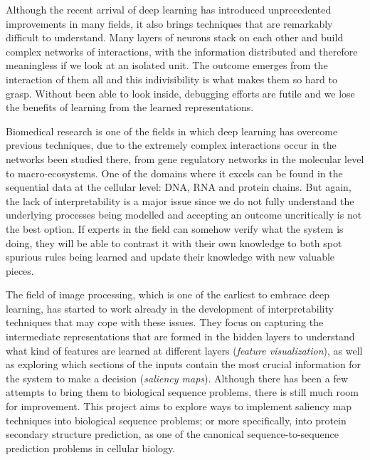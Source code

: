 Although the recent arrival of deep learning has introduced unprecedented improvements in many fields, it also brings techniques that are remarkably difficult to understand. Many layers of neurons stack on each other and build complex networks of interactions, with the information distributed and therefore meaningless if we look at an isolated unit. The outcome emerges from the interaction of them all and this indivisibility is what makes them so hard to grasp. Without been able to look inside, debugging efforts are futile and we lose the benefits of learning from the learned representations.

Biomedical research is one of the fields in which deep learning has overcome previous techniques, due to the extremely complex interactions occur in the networks been studied there, from gene regulatory networks in the molecular level to macro-ecosystems. One of the domains where it excels can be found in the sequential data at the cellular level: DNA, RNA and protein chains. But again, the lack of interpretability is a major issue since we do not fully understand the underlying processes being modelled and accepting an outcome uncritically is not the best option. If experts in the field can somehow verify what the system is doing, they will be able to contrast it with their own knowledge to both spot spurious rules being learned and update their knowledge with new valuable pieces.

The field of image processing, which is one of the earliest to embrace deep learning, has started to work already in the development of interpretability techniques that may cope with these issues. They focus on capturing the intermediate representations that are formed in the hidden layers to understand what kind of features are learned at different layers (\textit{feature visualization}), as well as exploring which sections of the inputs contain the most crucial information for the system to make a decision (\textit{saliency maps}). Although there has been a few attempts to bring them to biological sequence problems, there is still much room for improvement. This project aims to explore ways to implement saliency map techniques into biological sequence problems; or more specifically, into protein secondary structure prediction, as one of the canonical sequence-to-sequence prediction problems in cellular biology.